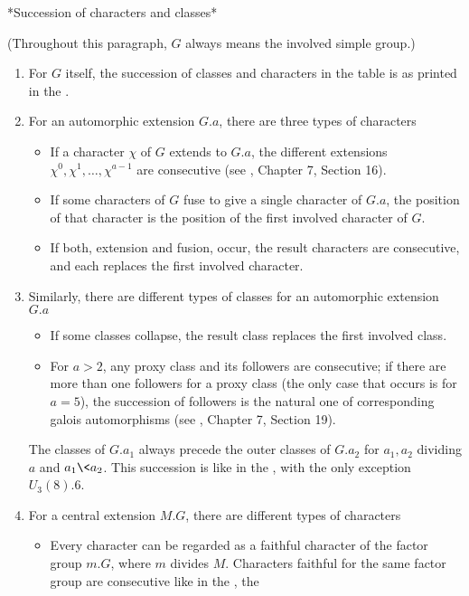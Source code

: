 *Succession of characters and classes*

(Throughout this paragraph,  $G$ always means the involved simple group.)
\begin{enumerate}
\item For $G$ itself,  the succession  of classes  and  characters in the
      {\GAP} table is as printed in the \ATLAS.
\item For  an  automorphic  extension  $G.a$,  there are  three  types of
      characters\:
\begin{itemize}
\item If  a character  $\chi$  of  $G$  extends to  $G.a$,  the different
      extensions  $\chi^0,\chi^1,\ldots,\chi^{a-1}$  are consecutive (see
      {\ATLAS}, Chapter 7, Section 16).
\item If some characters of $G$ fuse to give a single character of $G.a$,
      the  position  of  that  character  is the  position  of the  first
      involved character of $G$.
\item If both,  extension and fusion,  occur,  the result  characters are
      consecutive, and each replaces the first involved character.
\end{itemize}
\item Similarly,  there are different types of classes for an automorphic
      extension $G.a$\:
\begin{itemize}
\item If some  classes  collapse,  the  result class  replaces  the first
      involved class.
\item For $a > 2$,  any proxy class and its followers are consecutive; if
      there are more than one followers for a proxy class  (the only case
      that occurs is for  $a = 5$),  the  succession of followers  is the
      natural one  of corresponding  galois automorphisms  (see {\ATLAS},
      Chapter 7, Section 19).
\end{itemize}
      The classes of $G.a_1$  always precede the outer classes of $G.a_2$
      for  $a_1, a_2$ dividing  $a$ and $a_1 \< a_2$.  This succession is
      like in the \ATLAS, with the only exception $U_3(8).6$.
\item For  a  central  extension  $M.G$,  there  are  different  types of
      characters\:
\begin{itemize}
\item Every character  can be regarded  as a  faithful  character  of the
      factor group $m.G$, where $m$ divides $M$.  Characters faithful for
      the same  factor group  are  consecutive  like in the  \ATLAS,  the

\end{itemize}
\end{enumerate}

